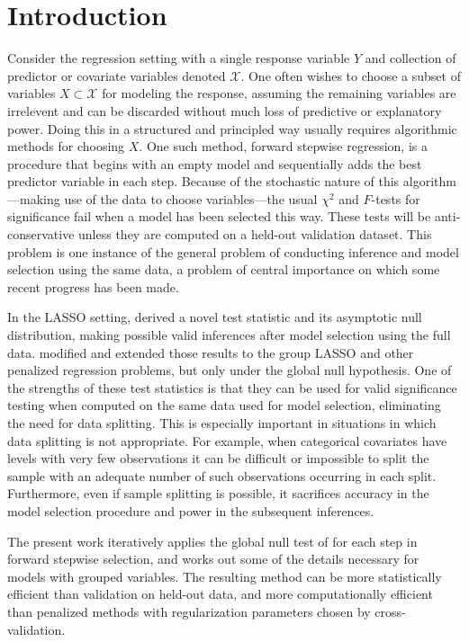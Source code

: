 \documentclass{imsart}
\begin{document}
\section{Introduction}
\label{sec:intro}

Consider the regression setting with a single response variable $Y$
and collection of predictor or covariate variables denoted $\mathcal X$.
One often wishes to choose a subset of variables $X \subset \mathcal X$
for modeling the response, assuming the remaining variables are
irrelevent and can be discarded without much loss of predictive
or explanatory power. Doing this in a structured and principled way
usually requires algorithmic methods for choosing $X$. One such method,
forward stepwise regression, is a procedure
that begins with an empty model and sequentially adds the best predictor
variable in each step. Because of the stochastic nature of this
algorithm---making use of the data to choose variables---the
usual $\chi^2$ and $F$-tests for significance
fail when a model has been selected this way. These tests will be
anti-conservative unless they are computed on a held-out validation
dataset. This problem is one instance of the general problem of
conducting inference and model selection using the same data, a problem
of central importance on which some recent progress has been made.

In the LASSO setting, \cite{significance:lasso} derived
a novel test statistic and its asymptotic null distribution, making
possible valid inferences after model selection using the full data.
\cite{tests:adaptive} modified and extended those results to the
group LASSO \citep{grouplasso} and other penalized regression
problems, but only under the global null hypothesis.
One of the strengths of these test statistics is that they can be
used for valid significance testing when computed on the same
data used for model selection, eliminating the need for data splitting.
This is especially important in
situations in which data splitting is not appropriate. For example,
when categorical covariates have levels with very few observations
it can be difficult or impossible to split the sample with an adequate
number of such observations occurring in each split. Furthermore, even
if sample splitting is possible, it sacrifices accuracy in the model
selection procedure and power in the subsequent inferences. 

The present work iteratively applies the global null test
of \cite{tests:adaptive} for each step in forward stepwise selection,
and works out some of the details necessary for
models with grouped variables. The resulting method can
be more statistically efficient than validation on held-out data, and
more computationally efficient than penalized methods with
regularization parameters chosen by cross-validation.
\end{document}
